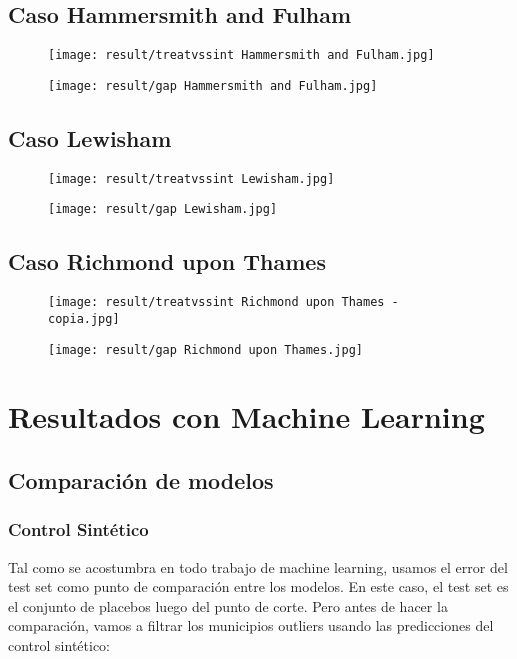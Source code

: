 \documentclass[12pt]{article}
\begin{document}
\subsection{Caso Hammersmith and Fulham}

\begin{figure}[H]
\centering
\texttt{[image: result/treatvssint Hammersmith and Fulham.jpg]}
\end{figure}

\begin{figure}[H]
\centering
\texttt{[image: result/gap Hammersmith and Fulham.jpg]}
\end{figure}

\subsection{Caso Lewisham}

\begin{figure}[H]
\centering
\texttt{[image: result/treatvssint Lewisham.jpg]}
\end{figure}

\begin{figure}[H]
\centering
\texttt{[image: result/gap Lewisham.jpg]}
\end{figure}

\subsection{Caso Richmond upon Thames}

\begin{figure}[H]
\centering
\texttt{[image: result/treatvssint Richmond upon Thames - copia.jpg]}
\end{figure}

\begin{figure}[H]
\centering
\texttt{[image: result/gap Richmond upon Thames.jpg]}
\end{figure}
\pagebreak
\section{Resultados con Machine Learning}
\label{sec:ResultadosML}

\subsection{Comparación de modelos}
\subsubsection{Control Sintético}
Tal como se acostumbra en todo trabajo de machine learning, usamos el error del test set como punto de comparación entre los modelos. En este caso, el test set es el conjunto de placebos luego del punto de corte. Pero antes de hacer la comparación, vamos a filtrar los municipios outliers usando las predicciones del control sintético:
\end{document}
